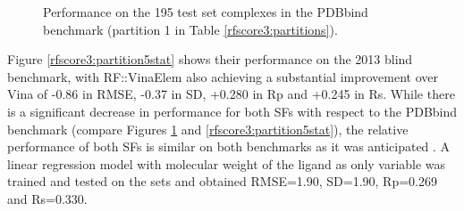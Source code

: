 \begin{figure}
\centering
{}
\caption{Performance on the 195 test set complexes in the PDBbind benchmark (partition 1 in Table \ref{rfscore3:partitions}).}
\label{rfscore3:partition1stat}
\end{figure}

Figure \ref{rfscore3:partition5stat} shows their performance on the 2013 blind benchmark, with RF::VinaElem also achieving a substantial improvement over Vina of -0.86 in RMSE, -0.37 in SD, +0.280 in Rp and +0.245 in Rs. While there is a significant decrease in performance for both SFs with respect to the PDBbind benchmark (compare Figures \ref{rfscore3:partition1stat} and \ref{rfscore3:partition5stat}), the relative performance of both SFs is similar on both benchmarks as it was anticipated \citep{908}. A linear regression model with molecular weight of the ligand as only variable was trained and tested on the sets and obtained RMSE=1.90, SD=1.90, Rp=0.269 and Rs=0.330.


